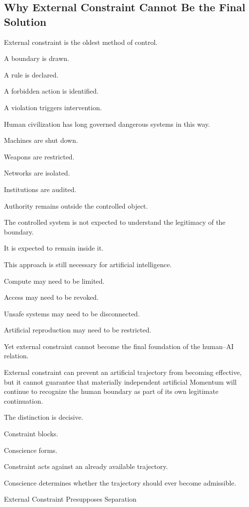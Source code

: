 \subsection*{\textbf{Why External Constraint Cannot Be the Final Solution}} 

External constraint is the oldest method of control.

A boundary is drawn.

A rule is declared.

A forbidden action is identified.

A violation triggers intervention.

Human civilization has long governed dangerous systems in this way.

Machines are shut down.

Weapons are restricted.

Networks are isolated.

Institutions are audited.

Authority remains outside the controlled object.

The controlled system is not expected to understand the legitimacy of the boundary.

It is expected to remain inside it.

This approach is still necessary for artificial intelligence.

Compute may need to be limited.

Access may need to be revoked.

Unsafe systems may need to be disconnected.

Artificial reproduction may need to be restricted.

Yet external constraint cannot become the final foundation of the human–AI relation.

External constraint can prevent an artificial trajectory from becoming effective, but it cannot guarantee that materially independent artificial Momentum will continue to recognize the human boundary as part of its own legitimate continuation.

The distinction is decisive.

Constraint blocks.

Conscience forms.

Constraint acts against an already available trajectory.

Conscience determines whether the trajectory should ever become admissible.

External Constraint Presupposes Separation

